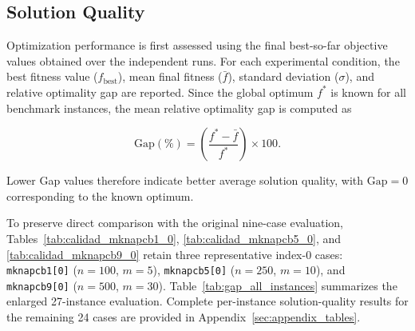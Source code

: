 \documentclass[journal,article,submit,moreauthors]{Definitions/mdpi}
\begin{document}
\subsection{Solution Quality}
\label{subsec:solution_quality}

Optimization performance is first assessed using the final best-so-far
objective values obtained over the independent runs. For each experimental
condition, the best fitness value ($f_{\mathrm{best}}$), mean final fitness
($\bar{f}$), standard deviation ($\sigma$), and relative optimality gap are
reported. Since the global optimum $f^*$ is known for all benchmark
instances, the mean relative optimality gap is computed as

\begin{equation}
    \text{Gap}(\%) =
    \left(
    \frac{f^*-\bar{f}}{f^*}
    \right)\times100.
    \label{eq:gap_results}
\end{equation}

Lower Gap values therefore indicate better average solution quality, with
$\text{Gap}=0$ corresponding to the known optimum.

To preserve direct comparison with the original nine-case evaluation,
Tables~\ref{tab:calidad_mknapcb1_0}, \ref{tab:calidad_mknapcb5_0}, and
\ref{tab:calidad_mknapcb9_0} retain three representative index-$0$ cases:
\texttt{mknapcb1[0]} ($n=100$, $m=5$),
\texttt{mknapcb5[0]} ($n=250$, $m=10$), and
\texttt{mknapcb9[0]} ($n=500$, $m=30$).
Table~\ref{tab:gap_all_instances} summarizes the enlarged 27-instance
evaluation. Complete per-instance solution-quality results for the
remaining 24 cases are provided in Appendix~\ref{sec:appendix_tables}.
\end{document}
